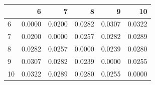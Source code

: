 \begin{tabular}{lrrrrr}
\toprule
 & 6 & 7 & 8 & 9 & 10 \\
\midrule
6 & 0.0000 & 0.0200 & 0.0282 & 0.0307 & 0.0322 \\
7 & 0.0200 & 0.0000 & 0.0257 & 0.0282 & 0.0289 \\
8 & 0.0282 & 0.0257 & 0.0000 & 0.0239 & 0.0280 \\
9 & 0.0307 & 0.0282 & 0.0239 & 0.0000 & 0.0255 \\
10 & 0.0322 & 0.0289 & 0.0280 & 0.0255 & 0.0000 \\
\bottomrule
\end{tabular}
